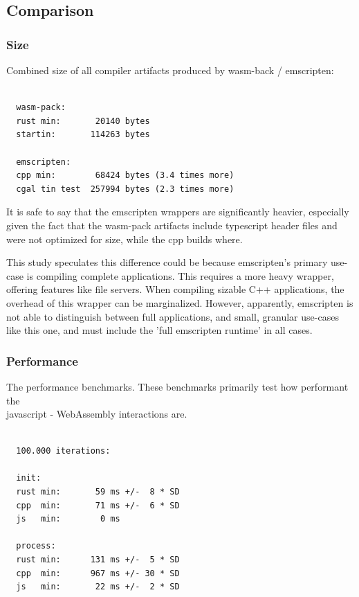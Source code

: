 \newpage
\subsection{Comparison}

\subsubsection*{Size}

Combined size of all compiler artifacts produced by wasm-back / emscripten:

\begin{lstlisting}

  wasm-pack:
  rust min:       20140 bytes 
  startin:       114263 bytes 

  emscripten:
  cpp min:        68424 bytes (3.4 times more)
  cgal tin test  257994 bytes (2.3 times more)

\end{lstlisting}

It is safe to say that the emscripten wrappers are significantly heavier, especially given the fact that the wasm-pack artifacts include typescript header files and were not optimized for size, while the cpp builds where.

This study speculates this difference could be because emscripten's primary use-case is compiling complete applications. 
This requires a more heavy wrapper, offering features like file servers. 
When compiling sizable C++ applications, the overhead of this wrapper can be marginalized.
However, apparently, emscripten is not able to distinguish between full applications, and small, granular use-cases like this one, and must include the 'full emscripten runtime' in all cases.

\subsubsection*{Performance}

The performance benchmarks. 
These benchmarks primarily test how performant the \\ javascript - WebAssembly interactions are. 

\begin{lstlisting}

  100.000 iterations:

  init: 
  rust min:       59 ms +/-  8 * SD
  cpp  min:       71 ms +/-  6 * SD
  js   min:        0 ms

  process: 
  rust min:      131 ms +/-  5 * SD
  cpp  min:      967 ms +/- 30 * SD
  js   min:       22 ms +/-  2 * SD
\end{lstlisting}

